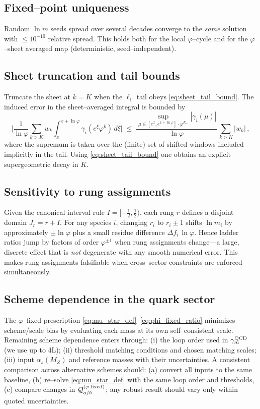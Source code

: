 \documentclass[%
  amsmath,amssymb,
  aps,
 prb,
 floatfix, showkeys
 ]{revtex4-2}
\begin{document}
 \subsection{Fixed--point uniqueness}
 \label{subsec:error_fixed_point}
 Random $\ln m$ seeds spread over several decades converge to the \emph{same} solution with $\le 10^{-10}$ relative spread. This holds both for the local $\varphi$–cycle and for the $\varphi$–sheet averaged map (deterministic, seed–independent).
 
 \subsection{Sheet truncation and tail bounds}
 \label{subsec:error_sheet}
 Truncate the sheet at $k=K$ when the $\ell_1$ tail obeys \eqref{eq:sheet_tail_bound}.
 The induced error in the sheet--averaged integral is bounded by
 \begin{equation}
   \biggl|\frac{1}{\ln\varphi}\sum_{k>K}\! w_k \int_x^{x+\ln\varphi}\gamma_i(e^\xi \varphi^{k})\,d\xi \biggr|
   \;\le\; \frac{\sup_{\mu\in[e^x,e^{x+\ln\varphi}]\cdot\varphi^{K..}}|\gamma_i(\mu)|}{\ln\varphi}\,\sum_{k>K}|w_k|\,,
   \label{eq:sheet_trunc_error}
 \end{equation}
 where the supremum is taken over the (finite) set of shifted windows included implicitly in the tail. Using \eqref{eq:sheet_tail_bound} one obtains an explicit supergeometric decay in $K$.
 
 \subsection{Sensitivity to rung assignments}
 \label{subsec:error_rungs}
 Given the canonical interval rule $I=[-\tfrac{1}{2},\tfrac{1}{2})$, each rung $r$ defines a disjoint domain $J_r=r+I$. For any species $i$, changing $r_i$ to $r_i\pm 1$ shifts $\ln \widehat m_i$ by approximately $\pm \ln\varphi$ plus a small residue difference $\Delta f_i\,\ln\varphi$. Hence ladder ratios jump by factors of order $\varphi^{\pm 1}$ when rung assignments change---a large, discrete effect that is \emph{not} degenerate with any smooth numerical error. This makes rung assignments falsifiable when cross--sector constraints are enforced simultaneously.
 
   \subsection{Scheme dependence in the quark sector}
 \label{subsec:error_schemes}
 The $\varphi$--fixed prescription \eqref{eq:mu_star_def}–\eqref{eq:phi_fixed_ratio} minimizes scheme/scale bias by evaluating each mass at its own self--consistent scale. Remaining scheme dependence enters through:
 (i) the loop order used in $\gamma_m^{\rm QCD}$ (we use up to 4L);
 (ii) threshold matching conditions and chosen matching scales;
 (iii) input $\alpha_s(M_Z)$ and reference masses with their uncertainties.
 A consistent comparison across alternative schemes should:
 (a) convert all inputs to the same baseline,
 (b) re--solve \eqref{eq:mu_star_def} with the same loop order and thresholds,
 (c) compare changes in $\mathcal{Q}_{a/b}^{(\varphi{\rm\;fixed})}$; any robust result should vary only within quoted uncertainties.
 
\end{document}
